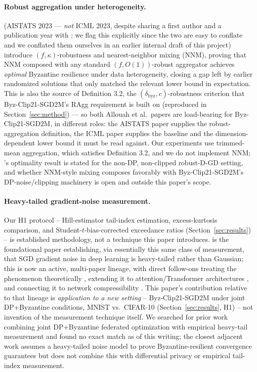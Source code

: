 \documentclass{article}
\begin{document}
\paragraph{Robust aggregation under heterogeneity.}
\citet{allouah2023fixing} (AISTATS 2023 --- \emph{not} ICML 2023, despite sharing
a first author and a publication year with \citet{allouah2023trilemma}; we flag
this explicitly since the two are easy to conflate and we conflated them
ourselves in an earlier internal draft of this project) introduce
$(f,\kappa)$-robustness and nearest-neighbor mixing (NNM), proving that NNM
composed with any standard $(f,O(1))$-robust aggregator achieves
\emph{optimal} Byzantine resilience under data heterogeneity, closing a gap left
by earlier randomized solutions that only matched the relevant lower bound in
expectation. This is also the source of Definition 3.2, the
$(\delta_{\mathrm{byz}},c)$-robustness criterion that Byz-Clip21-SGD2M's RAgg
requirement is built on (reproduced in Section~\ref{sec:method}) --- so both
Allouah et al.\ papers are load-bearing for Byz-Clip21-SGD2M, in different roles:
the AISTATS paper supplies the robust-aggregation definition, the ICML paper
supplies the baseline and the dimension-dependent lower bound it must be read
against. Our experiments use trimmed-mean aggregation, which satisfies
Definition 3.2, and we do not implement NNM; \citet{allouah2023fixing}'s
optimality result is stated for the non-DP, non-clipped robust-D-GD setting, and
whether NNM-style mixing composes favorably with Byz-Clip21-SGD2M's
DP-noise/clipping machinery is open and outside this paper's scope.

\paragraph{Heavy-tailed gradient-noise measurement.} Our H1 protocol --
Hill-estimator tail-index estimation, excess-kurtosis comparison, and
Student-$t$-bias-corrected exceedance ratios (Section~\ref{sec:results}) -- is
established methodology, not a technique this paper introduces.
\citet{simsekli2019tailindex} is the foundational paper establishing, via
essentially this same class of measurement, that SGD gradient noise in deep
learning is heavy-tailed rather than Gaussian; this is now an active,
multi-paper lineage, with direct follow-ons treating the phenomenon
theoretically \citep{gurbuzbalaban2021heavytail}, extending it to
attention/Transformer architectures \citep{zhang2020adaptive}, and connecting
it to network compressibility \citep{barsbey2021compressibility}. This
paper's contribution relative to that lineage is \emph{application to a new
setting} -- Byz-Clip21-SGD2M under joint DP+Byzantine conditions, MNIST
vs.\ CIFAR-10 (Section~\ref{sec:results}, H1) -- not invention of the
measurement technique itself. We searched for prior work combining joint
DP+Byzantine federated optimization with empirical heavy-tail measurement and
found no exact match as of this writing; the closest adjacent work assumes a
heavy-tailed noise model to prove Byzantine-resilient convergence guarantees
but does not combine this with differential privacy or empirical tail-index
measurement.
\end{document}

